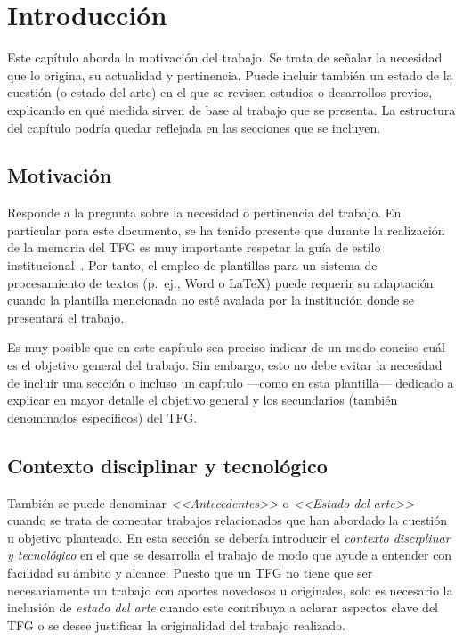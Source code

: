 \chapter{Introducción}
\label{cap:Introduccion}

Este capítulo aborda la motivación del trabajo. Se trata de señalar la necesidad que lo origina, su actualidad y pertinencia. Puede incluir también un estado de la cuestión (o estado del arte) en el que se revisen estudios o desarrollos previos, explicando en qué medida sirven de base al trabajo que se presenta. La estructura del capítulo podría quedar reflejada en las secciones que se incluyen.

\section{Motivación}
Responde a la pregunta sobre la necesidad o pertinencia del trabajo. En particular para este documento, se ha tenido presente que durante la realización de la memoria del TFG es muy importante respetar la guía de estilo  institucional~\cite{esi19}. Por tanto, el empleo de plantillas para un sistema de procesamiento de textos (p.~ej., Word o \LaTeX) puede requerir su adaptación cuando la plantilla mencionada no esté avalada por la institución donde se presentará el trabajo.

Es muy posible que en este capítulo sea preciso indicar de un modo conciso cuál es el objetivo general del trabajo. Sin embargo, esto no debe evitar la necesidad de incluir una sección o incluso un capítulo ---como en esta plantilla--- dedicado a explicar en mayor detalle el objetivo general y los secundarios (también denominados específicos) del TFG.

\section{Contexto disciplinar y tecnológico}
También se puede denominar \emph{<<Antecedentes>>} o \emph{<<Estado del arte>>} cuando se trata de comentar trabajos relacionados que han abordado la cuestión u objetivo planteado. En esta sección se debería introducir el \emph{contexto disciplinar y tecnológico} en el que se desarrolla el trabajo de modo que ayude a entender con facilidad su ámbito y alcance. Puesto que un TFG no tiene que ser necesariamente un trabajo con aportes novedosos u originales, solo es necesario la inclusión de \emph{estado del arte} cuando este contribuya a aclarar aspectos clave del TFG o se desee justificar la originalidad del trabajo realizado.

